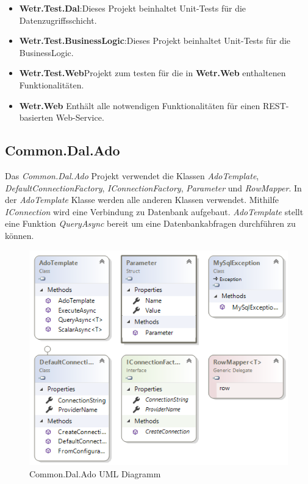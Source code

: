 \begin{itemize}
    \item \textbf{Wetr.Test.Dal}:\newline Dieses Projekt beinhaltet Unit-Tests für die Datenzugriffsschicht.
    \item \textbf{Wetr.Test.BusinessLogic}:\newline Dieses Projekt beinhaltet Unit-Tests für die BusinessLogic.
    \item \textbf{Wetr.Test.Web}\newline Projekt zum testen für die in \textbf{Wetr.Web} enthaltenen Funktionalitäten.
    \item \textbf{Wetr.Web} \newline Enthält alle notwendigen Funktionalitäten für einen REST-basierten Web-Service.
\end{itemize}

\newpage
\subsection{Common.Dal.Ado}
Das \textit{Common.Dal.Ado} Projekt verwendet die Klassen \textit{AdoTemplate}, \textit{DefaultConnectionFactory}, \textit{IConnectionFactory}, \textit{Parameter} und  \textit{RowMapper}. In der  \textit{AdoTemplate} Klasse werden alle anderen Klassen verwendet. Mithilfe  \textit{IConnection} wird eine Verbindung zu Datenbank aufgebaut.  \textit{AdoTemplate} stellt eine Funktion  \textit{QueryAsync} bereit um eine Datenbankabfragen durchführen zu können.

\begin{figure}[H]
\centering
\includegraphics[width=.8\textwidth]{pictures/Common_Dal_Ado_ClassDiagramm.png}
\caption{Common.Dal.Ado UML Diagramm}
\label{fig:common.dal.ado}
\end{figure}
\raggedright

